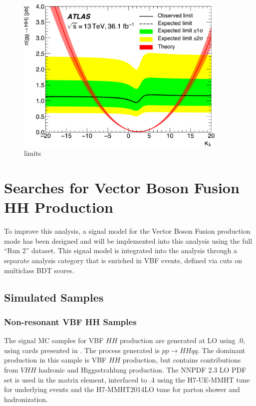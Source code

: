 \begin{figure}[htbp]
  \centering
\includegraphics[width=0.9\textwidth]{chapters/chapter5_yybb/images/limits/lambda.pdf}
  \caption{limits}
  \label{fig:limits-klambda}
\end{figure}

\section{Searches for Vector Boson Fusion HH Production}

To improve this analysis, a signal model for the Vector Boson Fusion production mode has been designed and will be implemented into this analysis using the full ``Run 2'' dataset. This signal model is integrated into the analysis through a separate analysis category that is enriched in VBF events, defined via cuts on multiclass \gls{BDT} scores.

\subsection{Simulated Samples}

\subsubsection{Non-resonant VBF HH Samples}

The signal MC samples for VBF $HH$ production are generated at LO using .0, using cards presented in \cite{vbfhh}. The process generated is $pp \rightarrow HHqq$. The dominant production in this sample is VBF $HH$ production, but contains contributions from $VHH$  hadronic and Higgsstrahlung production. The NNPDF 2.3 LO PDF set \cite{NNPDF} is used in the matrix element, interfaced to .4 using the H7-UE-MMHT tune for underlying events and the H7-MMHT2014LO tune for parton shower and hadronization.

